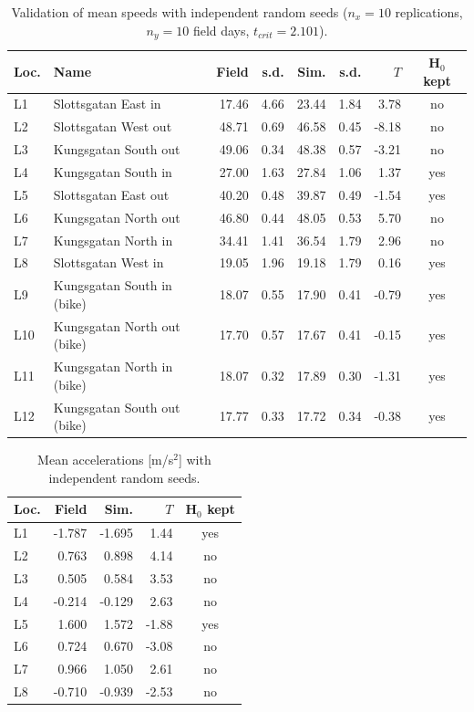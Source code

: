 \begin{table}[H]
\centering
\caption{Validation of mean speeds with independent random seeds ($n_x=10$ replications, $n_y=10$ field days, $t_{crit}=2.101$).}
\begin{tabular}{llrrrrrc}
\toprule
\textbf{Loc.} & \textbf{Name} & \textbf{Field} & \textbf{s.d.} & \textbf{Sim.} & \textbf{s.d.} & $T$ & \textbf{H$_0$ kept}\\
\midrule
L1 & Slottsgatan East in & 17.46 & 4.66 & 23.44 & 1.84 & 3.78 & no\\
L2 & Slottsgatan West out & 48.71 & 0.69 & 46.58 & 0.45 & -8.18 & no\\
L3 & Kungsgatan South out & 49.06 & 0.34 & 48.38 & 0.57 & -3.21 & no\\
L4 & Kungsgatan South in & 27.00 & 1.63 & 27.84 & 1.06 & 1.37 & yes\\
L5 & Slottsgatan East out & 40.20 & 0.48 & 39.87 & 0.49 & -1.54 & yes\\
L6 & Kungsgatan North out & 46.80 & 0.44 & 48.05 & 0.53 & 5.70 & no\\
L7 & Kungsgatan North in & 34.41 & 1.41 & 36.54 & 1.79 & 2.96 & no\\
L8 & Slottsgatan West in & 19.05 & 1.96 & 19.18 & 1.79 & 0.16 & yes\\
L9 & Kungsgatan South in (bike) & 18.07 & 0.55 & 17.90 & 0.41 & -0.79 & yes\\
L10 & Kungsgatan North out (bike) & 17.70 & 0.57 & 17.67 & 0.41 & -0.15 & yes\\
L11 & Kungsgatan North in (bike) & 18.07 & 0.32 & 17.89 & 0.30 & -1.31 & yes\\
L12 & Kungsgatan South out (bike) & 17.77 & 0.33 & 17.72 & 0.34 & -0.38 & yes\\
\bottomrule
\end{tabular}
\end{table}

\begin{table}[H]
\centering
\caption{Mean accelerations [m/s$^2$] with independent random seeds.}
\begin{tabular}{lrrrc}
\toprule
\textbf{Loc.} & \textbf{Field} & \textbf{Sim.} & $T$ & \textbf{H$_0$ kept}\\
\midrule
L1 & -1.787 & -1.695 & 1.44 & yes\\
L2 & 0.763 & 0.898 & 4.14 & no\\
L3 & 0.505 & 0.584 & 3.53 & no\\
L4 & -0.214 & -0.129 & 2.63 & no\\
L5 & 1.600 & 1.572 & -1.88 & yes\\
L6 & 0.724 & 0.670 & -3.08 & no\\
L7 & 0.966 & 1.050 & 2.61 & no\\
L8 & -0.710 & -0.939 & -2.53 & no\\
\bottomrule
\end{tabular}
\end{table}